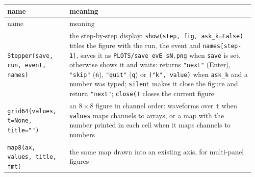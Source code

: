 \documentclass[11pt]{article}
\newcommand{\code}[1]{\texttt{#1}}
\begin{document}
\begin{longtable}{l p{92mm}}
\toprule
name & meaning \\
\midrule
\endfirsthead
\toprule
name & meaning \\
\midrule
\endhead
\code{Stepper(save, run, event, names)} & the step-by-step display: \code{show(step, fig, ask\_k=False)} titles the figure with the run, the event and \code{names[step-1]}, saves it as \code{PLOTS/save\_evE\_sN.png} when \code{save} is set, otherwise shows it and waits: returns \code{"next"} (Enter), \code{"skip"} (\code{n}), \code{"quit"} (\code{q}) or \code{("k", value)} when \code{ask\_k} and a number was typed; \code{silent} makes it close the figure and return \code{"next"}; \code{close()} closes the current figure \\
\code{grid64(values, t=None, title="")} & an $8\times8$ figure in channel order: waveforms over \code{t} when \code{values} maps channels to arrays, or a map with the number printed in each cell when it maps channels to numbers \\
\code{map8(ax, values, title, fmt)} & the same map drawn into an existing axis, for multi-panel figures \\
\bottomrule
\end{longtable}
\end{document}
